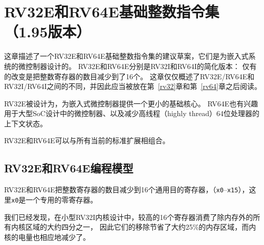 \chapter{RV32E和RV64E基础整数指令集（1.95版本）}
\label{rv32e}

这章描述了一个RV32E和RV64E基础整数指令集的建议草案，它们是为嵌入式系统的微控制器设计的。
RV32E和RV64E分别是RV32I和RV64I的简化版本：
仅有的改变是把整数寄存器的数目减少到了16个。
这章仅仅概述了RV32E/RV64E和RV32I/RV64I之间的不同，并因此应当被放在第~\ref{rv32}章和第~\ref{rv64}章之后阅读。

\begin{commentary}
RV32E被设计为，为嵌入式微控制器提供一个更小的基础核心。
RV64E也有兴趣用于大型SoC设计中的微控制器、以及减少高线程（highly thread）64位处理器的上下文状态。

RV32E和RV64E可以与所有当前的标准扩展相组合。
\end{commentary}

\section{RV32E和RV64E编程模型}

RV32E和RV64E把整数寄存器的数目减少到16个通用目的寄存器，（{\tt x0}--{\tt x15}），这里{\tt x0}是一个专用的零寄存器。

\begin{commentary}
我们已经发现，在小型RV32I内核设计中，较高的16个寄存器消费了除内存外的所有内核区域的大约四分之一，
因此它们的移除节省了大约25\%的内存区域，而内核的电量也相应地减少了。
\end{commentary}

